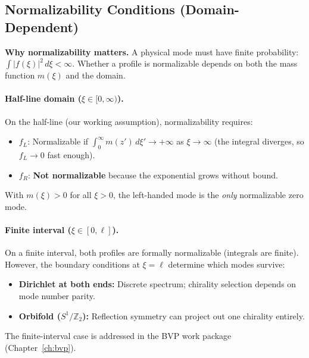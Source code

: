 \subsection{Normalizability Conditions (Domain-Dependent)}

\textbf{Why normalizability matters.} A physical mode must have finite probability:
$\int |f(\xi)|^2 \, d\xi < \infty$. Whether a profile is normalizable depends on
both the mass function $m(\xi)$ and the domain.

\paragraph{Half-line domain ($\xi \in [0, \infty)$).}
On the half-line (our working assumption), normalizability requires:
\begin{itemize}[nosep]
    \item $f_L$: Normalizable if $\int_0^\infty m(z')\,d\xi' \to +\infty$ as $\xi \to \infty$
          (the integral diverges, so $f_L \to 0$ fast enough).
    \item $f_R$: \textbf{Not normalizable} because the exponential grows without bound.
\end{itemize}
With $m(\xi) > 0$ for all $\xi > 0$, the left-handed mode is the \emph{only} normalizable
zero mode.

\paragraph{Finite interval ($\xi \in [0, \ell]$).}
On a finite interval, both profiles are formally normalizable (integrals are finite).
However, the boundary conditions at $\xi = \ell$ determine which modes survive:
\begin{itemize}[nosep]
    \item \textbf{Dirichlet at both ends:} Discrete spectrum; chirality selection
          depends on mode number parity.
    \item \textbf{Orbifold ($S^1/\mathbb{Z}_2$):} Reflection symmetry can project
          out one chirality entirely.
\end{itemize}
The finite-interval case is addressed in the BVP work package (Chapter~\ref{ch:bvp}).

\begin{center}
\end{center}

